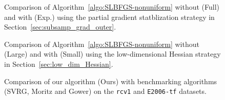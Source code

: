 \documentclass[10pt,twocolumn,journal]{IEEEtran}
\begin{document}
\begin{figure}[t]\centering
{}\hfill
{}
\caption{Comparison of Algorithm~\ref{algo:SLBFGS-nonuniform} without (Full) and with (Exp.) using the partial gradient statblization strategy in Section~\ref{sec:subsamp_grad_outer}.\label{fig:part_grad} }
\end{figure}

\begin{figure}[t]\centering
{}\hfill
{}
\caption{Comparison of Algorithm~\ref{algo:SLBFGS-nonuniform} without (Large) and with (Small) using the low-dimensional Hessian strategy in Section~\ref{sec:low_dim_Hessian}.\label{fig:lowdim_Hess} }
\end{figure}

\begin{figure}[t]\centering
{}\hfill
{}
\caption{Comparison of our algorithm (Ours) with benchmarking algorithms (SVRG, Moritz and Gower) on the {\tt rcv1} and {\tt E2006-tf} datasets.}\label{fig:diff_algo} 
\end{figure}





\renewcommand{\thedefinition}{A-\arabic{definition}}
\renewcommand{\thelemma}{T-\arabic{lemma}}
\renewcommand{\thecorollary}{A-\arabic{corollary}}
\renewcommand{\thesection}{A-\arabic{section}}
\renewcommand{\theremark}{A-\arabic{remark}}
\renewcommand{\thefigure}{A-\arabic{figure}}
\renewcommand{\thetable}{A-\arabic{table}}
\renewcommand{\thealgorithm}{A-\arabic{algorithm}}
\end{document}
